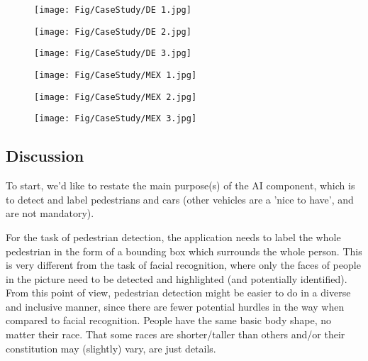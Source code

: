 \documentclass[runningheads,a4paper,11pt]{report}
\begin{document}
\begin{figure}[hbp]
\centering
  \texttt{[image: Fig/CaseStudy/DE 1.jpg]}
  \label{fig:CaseStudyGermany1}
\end{figure}

\begin{figure}[hbp]
\centering
  \texttt{[image: Fig/CaseStudy/DE 2.jpg]}
  \label{fig:CaseStudyGermany2}
\end{figure}

\begin{figure}[hbp]
\centering
    \texttt{[image: Fig/CaseStudy/DE 3.jpg]}
  \label{fig:CaseStudyGermany3}
\end{figure}

\begin{figure}[hbp]
\centering
  \texttt{[image: Fig/CaseStudy/MEX 1.jpg]}
  \label{fig:CaseStudyGermany1}
\end{figure}

\begin{figure}[hbp]
\centering
  \texttt{[image: Fig/CaseStudy/MEX 2.jpg]}
  \label{fig:CaseStudyGermany2}
\end{figure}

\begin{figure}[hbp]
\centering
    \texttt{[image: Fig/CaseStudy/MEX 3.jpg]}
  \label{fig:CaseStudyGermany3}
\end{figure}

\subsection{Discussion}

To start, we'd like to restate the main purpose(s) of the AI component, which is to detect and label pedestrians and cars (other vehicles are a 'nice to have', and are not mandatory). 

For the task of pedestrian detection, the application needs to label the whole pedestrian in the form of a bounding box which surrounds the whole person. This is very different from the task of facial recognition, where only the faces of people in the picture need to be detected and highlighted (and potentially identified). From this point of view, pedestrian detection might be easier to do in a diverse and inclusive manner, since there are fewer potential hurdles in the way when compared to facial recognition. People have the same basic body shape, no matter their race. That some races are shorter/taller than others and/or their constitution may (slightly) vary, are just details.
\end{document}

